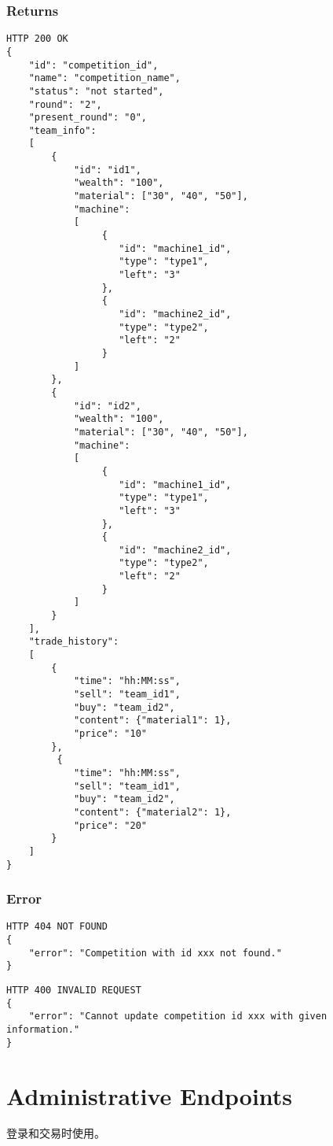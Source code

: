 \documentclass{article}
\begin{document}
\subsubsection*{Returns}
\begin{lstlisting}
HTTP 200 OK
{
    "id": "competition_id",
    "name": "competition_name",
    "status": "not started",
    "round": "2",
    "present_round": "0",
    "team_info":
    [
        {
            "id": "id1",
            "wealth": "100",
            "material": ["30", "40", "50"],
            "machine":
            [
                 {
                    "id": "machine1_id",
                    "type": "type1",
                    "left": "3"
                 },
                 {
                    "id": "machine2_id",
                    "type": "type2",
                    "left": "2"
                 }
            ]
        },
        {
            "id": "id2",
            "wealth": "100",
            "material": ["30", "40", "50"],
            "machine":
            [
                 {
                    "id": "machine1_id",
                    "type": "type1",
                    "left": "3"
                 },
                 {
                    "id": "machine2_id",
                    "type": "type2",
                    "left": "2"
                 }
            ]
        }
    ],
    "trade_history":
    [
        {
            "time": "hh:MM:ss",
            "sell": "team_id1",
            "buy": "team_id2",
            "content": {"material1": 1},
            "price": "10"
        },
         {
            "time": "hh:MM:ss",
            "sell": "team_id1",
            "buy": "team_id2",
            "content": {"material2": 1},
            "price": "20"
        }
    ]
}

\end{lstlisting}

\subsubsection*{Error}
\begin{lstlisting}
HTTP 404 NOT FOUND
{
    "error": "Competition with id xxx not found."
}
\end{lstlisting}

\begin{lstlisting}
HTTP 400 INVALID REQUEST
{
    "error": "Cannot update competition id xxx with given information."
}
\end{lstlisting}

\section{Administrative Endpoints}
登录和交易时使用。
\end{document}
